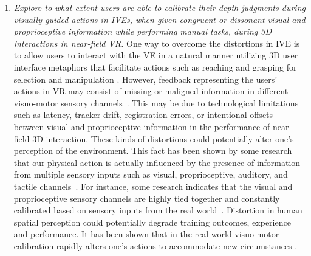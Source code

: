 \begin{enumerate}
	\item \textit{Explore to what extent users are able to calibrate their depth judgments during visually guided actions in IVEs, when given congruent or dissonant visual and proprioceptive information while performing manual tasks, during 3D interactions in near-field VR.} One way to overcome the distortions in IVE is to allow users to interact with the VE in a natural manner utilizing 3D user interface metaphors that facilitate actions such as reaching and grasping for selection and manipulation \cite{ANL+12,LBB99,BKL+04}. However, feedback representing the users' actions in VR may consist of missing or maligned information in different visuo-motor sensory channels~\cite{CM03}. This may be due to technological limitations such as latency, tracker drift, registration errors, or intentional offsets between visual and proprioceptive information in the performance of near-field 3D interaction. These kinds of distortions could potentially alter one's perception of the environment. This fact has been shown by some research that our physical action is actually influenced by the presence of information from multiple sensory inputs such as visual, proprioceptive, auditory, and tactile channels~\cite{G66}. For instance, some research indicates that the visual and proprioceptive sensory channels are highly tied together and constantly calibrated based on sensory inputs from the real world~\cite{BP98}. Distortion in human spatial perception could potentially degrade training outcomes, experience and performance. It has been shown that in the real world visuo-motor calibration rapidly alters one's actions to accommodate new circumstances \cite{BP98,BC12}. 
	
	

\end{enumerate}

